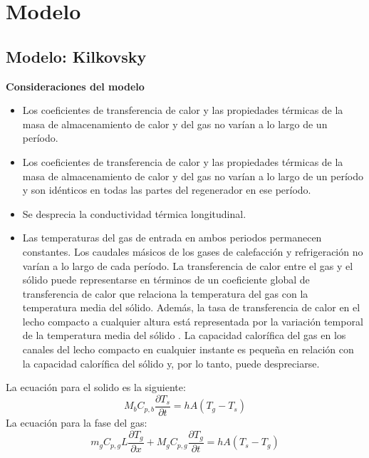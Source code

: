 \documentclass[12pt,letterpaper,final]{article}%
\begin{document}
\section{Modelo}
\subsection{Modelo: Kilkovsky}
\textbf{Consideraciones del modelo}
\begin{itemize}
	\item Los coeficientes de transferencia de calor y las propiedades térmicas de la masa de almacenamiento de calor y del gas no varían a lo largo de un período.
	\item Los coeficientes de transferencia de calor y las propiedades térmicas de la masa de almacenamiento de calor y del gas no varían a lo largo de un período
	y son idénticos en todas las partes del regenerador en ese período.
	\item Se desprecia la conductividad térmica longitudinal.
	\item Las temperaturas del gas de entrada en ambos periodos permanecen constantes.
	Los caudales másicos de los gases de calefacción y refrigeración no varían a lo largo de cada período.
	La transferencia de calor entre el gas y el sólido puede representarse en términos de un coeficiente global de transferencia de calor
	que relaciona la temperatura del gas con la temperatura media del sólido. Además, la tasa de transferencia de calor
	en el lecho compacto a cualquier altura está representada por la variación temporal de la temperatura media del sólido
	.
	La capacidad calorífica del gas en los canales del lecho compacto en cualquier instante es pequeña en relación con
	la capacidad calorífica del sólido y, por lo tanto, puede despreciarse.
	
\end{itemize}
La ecuación para el solido es la siguiente:
\begin{equation}
	M_bC_{p,b}\frac{\partial T_s}{\partial t} = hA(T_g - T_s)
\end{equation}
La ecuación para la fase del gas:
\begin{equation}
	m_gC_{p,g}L \frac{\partial T_g}{\partial x} + M_gC_{p,g}\frac{\partial T_g}{\partial t} = hA(T_s - T_g)
\end{equation}
\end{document}
